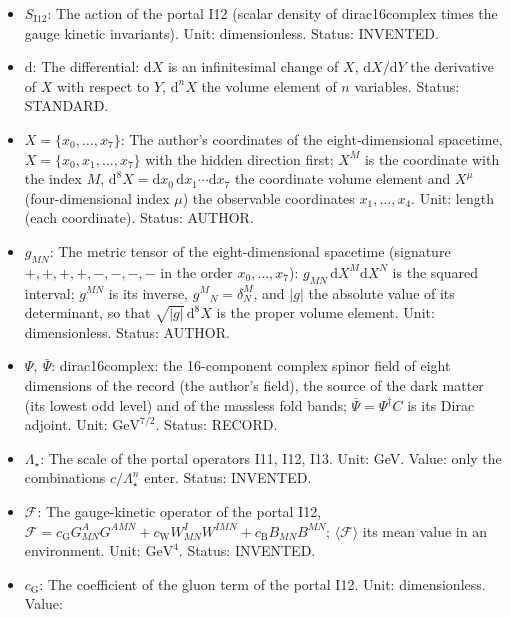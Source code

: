 \documentclass[
  10pt,
]{article}
\providecommand{\tightlist}{%
  \setlength{\itemsep}{0pt}\setlength{\parskip}{0pt}}
\begin{document}
\begin{itemize}
\tightlist
\item
  \(S_{\mathrm{I12}}\): The action of the portal I12 (scalar density of
  dirac16complex times the gauge kinetic invariants). Unit:
  dimensionless. Status: INVENTED.
\item
  \(\mathrm{d}\): The differential: \(\mathrm{d}X\) is an infinitesimal
  change of \(X\), \(\mathrm{d}X/\mathrm{d}Y\) the derivative of \(X\)
  with respect to \(Y\), \(\mathrm{d}^nX\) the volume element of \(n\)
  variables. Status: STANDARD.
\item
  \(X = \{x_0, \dots, x_7\}\): The author's coordinates of the
  eight-dimensional spacetime, \(X = \{x_0, x_1, \dots, x_7\}\) with the
  hidden direction first; \(X^M\) is the coordinate with the index
  \(M\),
  \(\mathrm{d}^8X = \mathrm{d}x_0\,\mathrm{d}x_1\cdots\mathrm{d}x_7\)
  the coordinate volume element and \(X^\mu\) (four-dimensional index
  \(\mu\)) the observable coordinates \(x_1, \dots, x_4\). Unit: length
  (each coordinate). Status: AUTHOR.
\item
  \(g_{MN}\): The metric tensor of the eight-dimensional spacetime
  (signature \(+,+,+,+,-,-,-,-\) in the order \(x_0, \dots, x_7\)):
  \(g_{MN}\,\mathrm{d}X^M\mathrm{d}X^N\) is the squared interval;
  \(g^{MN}\) is its inverse, \(g^M{}_N = \delta^M_N\), and
  \(\lvert g\rvert\) the absolute value of its determinant, so that
  \(\sqrt{\lvert g\rvert}\,\mathrm{d}^8X\) is the proper volume element.
  Unit: dimensionless. Status: AUTHOR.
\item
  \(\Psi,\ \bar\Psi\): dirac16complex: the 16-component complex spinor
  field of eight dimensions of the record (the author's field), the
  source of the dark matter (its lowest odd level) and of the massless
  fold bands; \(\bar\Psi = \Psi^\dagger C\) is its Dirac adjoint. Unit:
  \(\mathrm{GeV}^{7/2}\). Status: RECORD.
\item
  \(\Lambda_\star\): The scale of the portal operators I11, I12, I13.
  Unit: GeV. Value: only the combinations \(c/\Lambda_\star^n\) enter.
  Status: INVENTED.
\item
  \(\mathcal{F}\): The gauge-kinetic operator of the portal I12,
  \(\mathcal{F} = c_{\mathrm{G}}G^A_{MN}G^{AMN} + c_{\mathrm{W}}W^I_{MN}W^{IMN} + c_{\mathrm{B}}B_{MN}B^{MN}\);
  \(\langle\mathcal{F}\rangle\) its mean value in an environment. Unit:
  \(\mathrm{GeV}^{4}\). Status: INVENTED.
\item
  \(c_{\mathrm{G}}\): The coefficient of the gluon term of the portal
  I12. Unit: dimensionless. Value:

\end{itemize}
\end{document}
